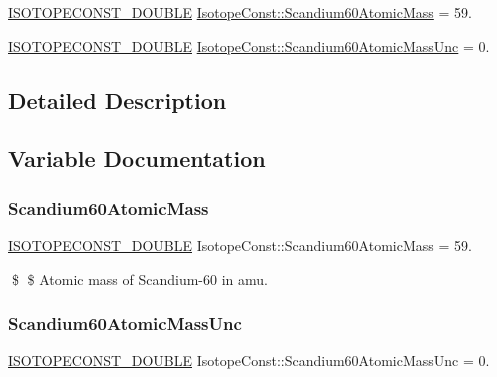 \begin{DoxyCompactItemize}
\item 
\mbox{\hyperlink{group___isotope_const-_macros_ga8f45a7272ce02c0b4c65c44636ed719a}{I\+S\+O\+T\+O\+P\+E\+C\+O\+N\+S\+T\+\_\+\+D\+O\+U\+B\+LE}} \mbox{\hyperlink{group___isotope_const-_scandium-_sc60_gaf6575b57b6b016d714dc4a26ca9a4813}{Isotope\+Const\+::\+Scandium60\+Atomic\+Mass}} = 59.
\item 
\mbox{\hyperlink{group___isotope_const-_macros_ga8f45a7272ce02c0b4c65c44636ed719a}{I\+S\+O\+T\+O\+P\+E\+C\+O\+N\+S\+T\+\_\+\+D\+O\+U\+B\+LE}} \mbox{\hyperlink{group___isotope_const-_scandium-_sc60_ga63125848d9eb130d81517d29399a2aca}{Isotope\+Const\+::\+Scandium60\+Atomic\+Mass\+Unc}} = 0.
\end{DoxyCompactItemize}


\subsection{Detailed Description}


\subsection{Variable Documentation}
\mbox{\label{group___isotope_const-_scandium-_sc60_gaf6575b57b6b016d714dc4a26ca9a4813}} 
\subsubsection{\texorpdfstring{Scandium60\+Atomic\+Mass}{Scandium60AtomicMass}}
{\footnotesize\ttfamily \mbox{\hyperlink{group___isotope_const-_macros_ga8f45a7272ce02c0b4c65c44636ed719a}{I\+S\+O\+T\+O\+P\+E\+C\+O\+N\+S\+T\+\_\+\+D\+O\+U\+B\+LE}} Isotope\+Const\+::\+Scandium60\+Atomic\+Mass = 59.}

\$ \$ Atomic mass of Scandium-\/60 in amu. \mbox{\label{group___isotope_const-_scandium-_sc60_ga63125848d9eb130d81517d29399a2aca}} 
\subsubsection{\texorpdfstring{Scandium60\+Atomic\+Mass\+Unc}{Scandium60AtomicMassUnc}}
{\footnotesize\ttfamily \mbox{\hyperlink{group___isotope_const-_macros_ga8f45a7272ce02c0b4c65c44636ed719a}{I\+S\+O\+T\+O\+P\+E\+C\+O\+N\+S\+T\+\_\+\+D\+O\+U\+B\+LE}} Isotope\+Const\+::\+Scandium60\+Atomic\+Mass\+Unc = 0.}

